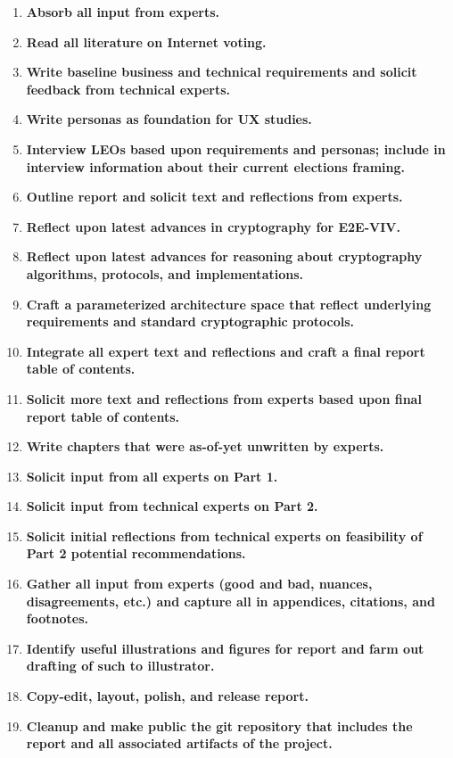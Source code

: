 \begin{enumerate}
\item \textbf{Absorb all input from experts.}
\item \textbf{Read all literature on Internet voting.}
\item \textbf{Write baseline business and technical requirements and
    solicit feedback from technical experts.}
\item \textbf{Write personas as foundation for UX studies.}
\item \textbf{Interview LEOs based upon requirements and personas;
    include in interview information about their current elections
    framing.}
\item \textbf{Outline report and solicit text and reflections from
    experts.}
\item \textbf{Reflect upon latest advances in cryptography for E2E-VIV.}
\item \textbf{Reflect upon latest advances for reasoning about
    cryptography algorithms, protocols, and implementations.}
\item \textbf{Craft a parameterized architecture space that reflect
    underlying requirements and standard cryptographic protocols.}
\item \textbf{Integrate all expert text and reflections and craft a
    final report table of contents.}
\item \textbf{Solicit more text and reflections from experts based
    upon final report table of contents.}
\item \textbf{Write chapters that were as-of-yet unwritten by experts.}
\item \textbf{Solicit input from all experts on Part 1.}
\item \textbf{Solicit input from technical experts on Part 2.}
\item \textbf{Solicit initial reflections from technical experts on
    feasibility of Part 2 potential recommendations.}
\item \textbf{Gather all input from experts (good and bad, nuances,
    disagreements, etc.) and capture all in appendices, citations, and
    footnotes.}
\item \textbf{Identify useful illustrations and figures for report and
    farm out drafting of such to illustrator.}
\item \textbf{Copy-edit, layout, polish, and release report.}
\item \textbf{Cleanup and make public the git repository that includes
  the report and all associated artifacts of the project.}
\end{enumerate}

